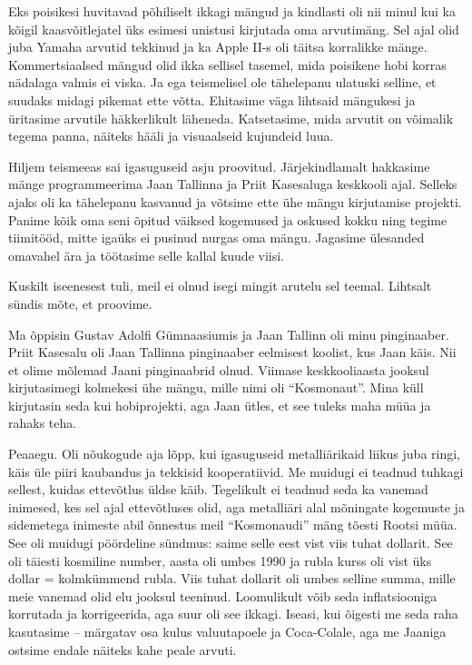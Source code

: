 
Eks poisikesi huvitavad põhiliselt ikkagi mängud ja kindlasti oli nii minul  
kui ka kõigil kaasvõitlejatel üks esimesi unistusi 
kirjutada oma arvutimäng. Sel ajal olid juba  
Yamaha arvutid tekkinud ja ka Apple II-s oli täitsa 
korralikke mänge. Kommertsiaalsed mängud olid ikka sellisel 
tasemel, mida poisikene hobi korras nädalaga valmis ei viska. Ja 
ega teismelisel ole tähelepanu ulatuski 
selline, et suudaks midagi pikemat ette võtta. Ehitasime väga 
lihtsaid mängukesi ja üritasime arvutile 
häkkerlikult läheneda. Katsetasime, mida arvutit on 
võimalik tegema panna, näiteks hääli ja visuaalseid kujundeid luua. 

Hiljem teismeeas sai igasuguseid asju proovitud. Järjekindlamalt 
hakkasime mänge programmeerima Jaan Tallinna ja Priit 
Kasesaluga keskkooli ajal. Selleks ajaks oli 
ka tähelepanu 
kasvanud ja võtsime ette ühe mängu kirjutamise projekti. Panime kõik oma seni 
õpitud väiksed kogemused 
ja oskused kokku ning tegime tiimitööd, mitte igaüks ei pusinud nurgas oma 
mängu. Jagasime 
ülesanded omavahel ära ja töötasime selle kallal kuude viisi. 


Kuskilt iseenesest tuli, meil ei olnud isegi
mingit arutelu sel teemal. Lihtsalt sündis mõte, et proovime. 


Ma õppisin Gustav Adolfi Gümnaasiumis
ja Jaan Tallinn oli minu pinginaaber. Priit 
Kasesalu oli Jaan Tallinna pinginaaber eelmisest 
koolist, kus Jaan käis. Nii et olime mõlemad Jaani pinginaabrid olnud. Viimase 
keskkooliaasta jooksul kirjutasimegi kolmekesi ühe mängu, 
mille nimi oli \enquote{Kosmonaut}. Mina küll  
kirjutasin seda kui hobiprojekti, aga Jaan ütles, et see tuleks maha müüa ja 
rahaks teha. 


Peaaegu. Oli nõukogude aja lõpp, kui igasuguseid 
metalliärikaid liikus juba ringi, käis üle piiri  
kaubandus ja tekkisid kooperatiivid. Me 
muidugi ei teadnud tuhkagi sellest, kuidas ettevõtlus 
üldse käib. Tegelikult ei teadnud seda ka vanemad inimesed, kes sel 
ajal ettevõtluses olid, aga metalliäri alal 
mõningate kogemuste ja 
sidemetega inimeste abil õnnestus meil \enquote{Kosmonaudi} mäng tõesti Rootsi müüa. 
See oli muidugi pöördeline sündmus: saime selle eest 
vist viis tuhat 
dollarit. See oli täiesti kosmiline number, aasta oli umbes 1990 ja rubla 
kurss oli vist üks dollar = kolmkümmend rubla. Viis tuhat dollarit 
oli umbes selline summa, mille meie vanemad olid elu jooksul teeninud. 
Loomulikult võib seda inflatsiooniga korrutada ja 
korrigeerida, aga suur oli see ikkagi. Iseasi, kui õigesti me seda raha 
kasutasime -- märgatav osa kulus 
valuutapoele ja Coca-Colale, aga me Jaaniga ostsime endale näiteks kahe 
peale arvuti. 

